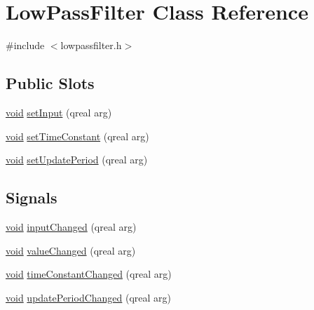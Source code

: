 \hypertarget{class_low_pass_filter}{\section{\-Low\-Pass\-Filter \-Class \-Reference}
\label{class_low_pass_filter}
}


{\ttfamily \#include $<$lowpassfilter.\-h$>$}

\subsection*{\-Public \-Slots}
\begin{DoxyCompactItemize}
\item 
\hyperlink{group___u_a_v_objects_plugin_ga444cf2ff3f0ecbe028adce838d373f5c}{void} \hyperlink{class_low_pass_filter_a8ffe4e89963aeeb9cbc3d7ff9ea7bf65}{set\-Input} (qreal arg)
\item 
\hyperlink{group___u_a_v_objects_plugin_ga444cf2ff3f0ecbe028adce838d373f5c}{void} \hyperlink{class_low_pass_filter_afbffbe1e5869efaa7e6af73cfdd73757}{set\-Time\-Constant} (qreal arg)
\item 
\hyperlink{group___u_a_v_objects_plugin_ga444cf2ff3f0ecbe028adce838d373f5c}{void} \hyperlink{class_low_pass_filter_a835f0c970fa58a7b456259b7871f3455}{set\-Update\-Period} (qreal arg)
\end{DoxyCompactItemize}
\subsection*{\-Signals}
\begin{DoxyCompactItemize}
\item 
\hyperlink{group___u_a_v_objects_plugin_ga444cf2ff3f0ecbe028adce838d373f5c}{void} \hyperlink{class_low_pass_filter_a2293d8b7286bf10aa2b01272be435fab}{input\-Changed} (qreal arg)
\item 
\hyperlink{group___u_a_v_objects_plugin_ga444cf2ff3f0ecbe028adce838d373f5c}{void} \hyperlink{class_low_pass_filter_a0cf9a9e7e11e71b2d69a166dca569e7b}{value\-Changed} (qreal arg)
\item 
\hyperlink{group___u_a_v_objects_plugin_ga444cf2ff3f0ecbe028adce838d373f5c}{void} \hyperlink{class_low_pass_filter_a2df94ddd52514427afeeaa55233d2ca9}{time\-Constant\-Changed} (qreal arg)
\item 
\hyperlink{group___u_a_v_objects_plugin_ga444cf2ff3f0ecbe028adce838d373f5c}{void} \hyperlink{class_low_pass_filter_a8ada11275d48621aeb4fc2d9bb09a6a3}{update\-Period\-Changed} (qreal arg)
\end{DoxyCompactItemize}
